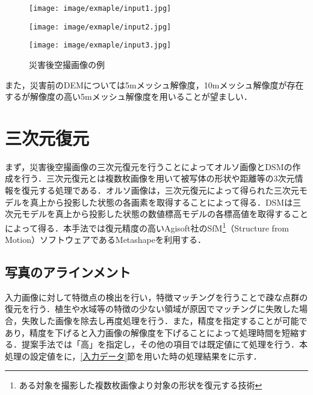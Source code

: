     \begin{figure}[t]
      \begin{minipage}[c]{0.329\hsize}
        \centering
        \texttt{[image: image/exmaple/input1.jpg]}
        \label{入力画像例1}
      \end{minipage}
      \begin{minipage}[c]{0.329\hsize}
        \centering
        \texttt{[image: image/exmaple/input2.jpg]}
        \label{入力画像例2}
      \end{minipage}
      \begin{minipage}[c]{0.329\hsize}
        \centering
        \texttt{[image: image/exmaple/input3.jpg]}
        \label{入力画像例3}
      \end{minipage}
      \caption{災害後空撮画像の例}
      \label{空撮画像例}
    \end{figure}

    また，災害前のDEMについては5mメッシュ解像度，10mメッシュ解像度が存在するが解像度の高い5mメッシュ解像度を用いることが望ましい．



  \section{三次元復元}
    まず，災害後空撮画像の三次元復元を行うことによってオルソ画像とDSMの作成を行う．三次元復元とは複数枚画像を用いて被写体の形状や距離等の3次元情報を復元する処理である．オルソ画像は，三次元復元によって得られた三次元モデルを真上から投影した状態の各画素を取得することによって得る．DSMは三次元モデルを真上から投影した状態の数値標高モデルの各標高値を取得することによって得る．本手法では復元精度の高いAgisoft社のSfM\footnote{ある対象を撮影した複数枚画像より対象の形状を復元する技術}（Structure from Motion）ソフトウェアであるMetashape\cite{Metashape}を利用する．


    \subsection{写真のアラインメント}
      \label{写真のアラインメント}
      入力画像に対して特徴点の検出を行い，特徴マッチングを行うことで疎な点群の復元を行う．植生や水域等の特徴の少ない領域が原因でマッチングに失敗した場合，失敗した画像を除去し再度処理を行う．また，精度を指定することが可能であり，精度を下げると入力画像の解像度を下げることによって処理時間を短縮する．提案手法では「高」を指定し，その他の項目では既定値にて処理を行う．本処理の設定値をに，\ref{入力データ}節を用いた時の処理結果をに示す．

